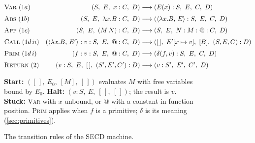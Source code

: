 \documentclass[11pt,a4paper]{article}
\makeatletter
\newcommand{\ap}{\mathtt{@}}
\newcommand{\cl}[2]{\langle #1,\, #2\rangle}
\newcommand{\emp}{[\,]}
\newcommand{\rul}[1]{\textsc{#1}}
\newcommand{\st}[4]{(#1,\ #2,\ #3,\ #4)}
\theoremstyle{definition}
\theoremstyle{plain}
\makeatother
\begin{document}
\begin{figure}[t]
\begin{tcolorbox}[colback=white, colframe=black!40, boxrule=0.6pt, arc=2pt, left=2pt, right=2pt]
\small
\[
\begin{array}{@{}l@{\quad}r@{\;}c@{\;}l@{}}
\rul{Var}\ (1a) &
  \st{S}{E}{x : C}{D} &\longrightarrow& \st{E(x) : S}{E}{C}{D}\\[6pt]
\rul{Abs}\ (1b) &
  \st{S}{E}{\lambda x.B : C}{D} &\longrightarrow& \st{\cl{\lambda x.B}{E} : S}{E}{C}{D}\\[6pt]
\rul{App}\ (1c) &
  \st{S}{E}{(M\,N) : C}{D} &\longrightarrow& \st{S}{E}{N : M : \ap : C}{D}\\[6pt]
\rul{Call}\ (1d\,ii) &
  \st{\cl{\lambda x.B}{E'} : v : S}{E}{\ap : C}{D} &\longrightarrow&
  \st{\emp}{E'[x\mapsto v]}{[B]}{(S,E,C) : D}\\[6pt]
\rul{Prim}\ (1d\,i) &
  \st{f : v : S}{E}{\ap : C}{D} &\longrightarrow& \st{\delta(f,v) : S}{E}{C}{D}\\[6pt]
\rul{Return}\ (2) &
  \st{v : S}{E}{\emp}{(S',E',C') : D} &\longrightarrow& \st{v : S'}{E'}{C'}{D}
\end{array}
\]
\par\medskip
\textbf{Start:} $\st{\emp}{E_0}{[M]}{\emp}$ evaluates $M$ with free
variables bound by $E_0$.\quad
\textbf{Halt:} $\st{v : S}{E}{\emp}{\emp}$; the result is $v$.\\
\textbf{Stuck:} \rul{Var} with $x$ unbound, or $\ap$ with a constant in
function position.\quad
\rul{Prim} applies when $f$ is a primitive; $\delta$ is its meaning (\cref{sec:primitives}).
\end{tcolorbox}
\caption{The transition rules of the SECD machine.}
\label{fig:rules}
\end{figure}
\end{document}
